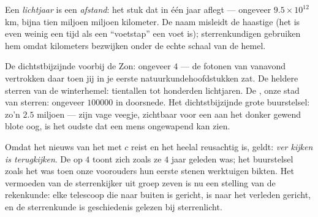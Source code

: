 \begin{definition}[Lichtjaar]\label{def:g8:speed-of-light:lightyear}
Een \emph{lichtjaar} is een \emph{afstand}: het stuk
dat  in één jaar aflegt --- ongeveer $9.5 \times 10^{12}$
km, bijna tien miljoen miljoen kilometer. De naam misleidt de haastige
(het is even weinig een tijd als een ``voetstap'' een voet is);
sterrenkundigen gebruiken hem omdat kilometers bezwijken onder de echte
schaal van de hemel.
\end{definition}

\begin{example}\label{ex:g8:speed-of-light:ladder}
De dichtstbijzijnde  voorbij de Zon: ongeveer $4$
 --- de fotonen van vanavond vertrokken daar toen jij
in je eerste natuurkundehoofdstukken zat. De heldere
sterren van de winterhemel: tientallen tot honderden
lichtjaren. De , onze stad van
sterren: ongeveer $100000$  in doorsnede.
Het dichtstbijzijnde grote buurstelsel: zo'n $2.5$ miljoen
 --- zijn vage veegje, zichtbaar voor een aan het
donker gewend blote oog, is het oudste  dat een mens
ongewapend kan zien.
\end{example}

\begin{proposition}\label{prop:g8:speed-of-light:timemachine}
Omdat het nieuws van het  met $c$ reist en het heelal
reusachtig is, geldt: \emph{ver kijken is terugkijken}. De
 op $4$  toont zich zoals ze $4$ jaar
geleden was; het buurstelsel zoals het was toen onze voorouders hun
eerste stenen werktuigen bikten. Het vermoeden van de sterrenkijker uit
groep zeven is nu een stelling van de rekenkunde: elke telescoop die
naar buiten is gericht, is naar het verleden gericht, en de
sterrenkunde is geschiedenis gelezen bij sterrenlicht.
\end{proposition}

